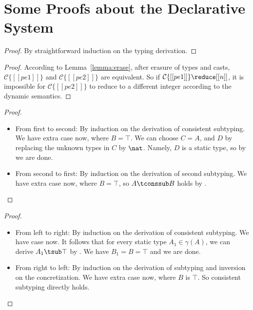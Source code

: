 
\section{Some Proofs about the Declarative System}


\lemmaerase*
\begin{proof}
By straightforward induction on the typing derivation.
\end{proof}

\lemmacoherence*
\begin{proof}
According to Lemma~\ref{lemma:erase}, after erasure of types and casts,
$\mathcal{C}\{[[pe1]]\}$ and $\mathcal{C}\{[[pe2]]\}$ are equivalent. So if
$\mathcal{C}\{ [[pe1]] \} \reduce [[n]]$, it is impossible for $\mathcal{C}\{
[[pe2]] \}$ to reduce to a different integer according to the dynamic semantics.
\end{proof}

\proptop*
\begin{proof} \leavevmode
  \begin{itemize}
  \item From first to second: By induction on the derivation of consistent
    subtyping. We have extra case  now, where $B = \top$.
    We can choose $C = A$, and
    $D$ by replacing the unknown types in $C$ by $\nat$. Namely, $D$ is a static
    type, so by  we are done.
  \item From second to first: By induction on the derivation of second
    subtyping. We have extra case  now, where
    $B = \top$, so $A \tconssub B$ holds by .
  \end{itemize}
\end{proof}

\propagttop*
\begin{proof} \leavevmode
  \begin{itemize}
  \item From left to right: By induction on the derivation of consistent
    subtyping. We have case  now.
    It follows that for
    every static type $A_1 \in \gamma(A)$, we can derive $A_1 \tsub \top$ by
    .
    We have $B_1 = B = \top$ and we are done.
  \item From right to left: By induction on the derivation of subtyping and
    inversion on the concretization. We have extra case  now, where
    $B$ is $\top$. So
    consistent subtyping directly holds.
  \end{itemize}
\end{proof}

